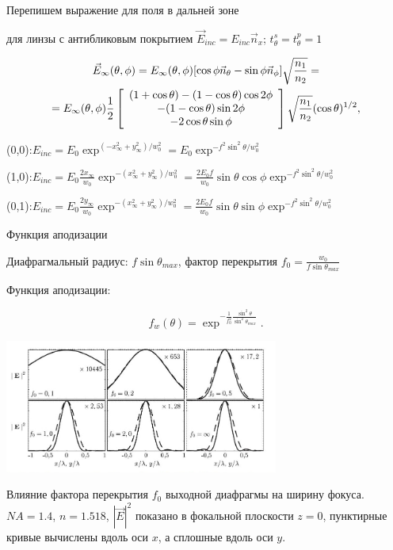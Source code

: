 \documentclass[9pt, compress, xcolor=table]{beamer}
\begin{document}
\begin{frame}{Перепишем выражение для поля в дальней зоне}

для линзы с антибликовым покрытием $\vec E_{inc} = E_{inc} \vec n_x$; $t_{\theta}^s =
t_{\theta}^p = 1$

\begin{multline*}
\vec E_{\infty}(\theta, \phi) =E_{\infty}(\theta,\phi)[\cos \phi \vec n_{\theta} - \sin \phi\vec
n_{\phi}] \sqrt{\frac{n_1}{n_2}} =
\\ =E_{\infty}(\theta, \phi) \frac{1}{2}\left[\array{c} (1 +
\cos \theta) - (1 - \cos \theta) \cos 2 \phi \\ - (1 - \cos \theta) \sin 2 \phi \\ - 2 \cos \theta
\sin \phi
\endarray\right] \sqrt{\frac{n_1}{n_2}} (\cos \theta)^{1/2},
\end{multline*}

(0,0):$ E_{inc} = E_0 \exp^{(-x_{\infty}^2 + y_{\infty}^2)/ w_0^2} = E_0 \exp^{-f^2 \sin^2 \theta
/ w_0^2}$

\medskip

(1,0):$ E_{inc} = E_0 \frac{2 x_{\infty}}{w_0}\exp^{-(x_{\infty}^2 + y_{\infty}^2)/w_0^2} = \frac{2
E_0 f}{w_0} \sin \theta \cos \phi \exp^{-f^2 \sin^2 \theta / w_0^2}$

\medskip

(0,1):$ E_{inc} = E_0 \frac{2 y_{\infty}}{w_0}\exp^{-(x_{\infty}^2 + y_{\infty}^2)/w_0^2} = \frac{2
E_0 f}{w_0} \sin \theta \sin \phi \exp^{-f^2 \sin^2 \theta / w_0^2}$


\end{frame}

\begin{frame}{Функция аподизации}

Диафрагмальный радиус: $f \sin \theta_{max}$, фактор перекрытия $f_0 = \frac{w_0}{f \sin
\theta_{max}}$

Функция аподизации:

\begin{equation*}
f_w(\theta) = \exp^{-\frac{1}{f_0^2}\frac{\sin^2 \theta}{\sin^2 \theta_{max}}}.
\end{equation*}

\begin{center}
\includegraphics[width=9cm]{fig3_07}
\end{center}

\small{Влияние фактора перекрытия $f_0$ выходной диафрагмы на ширину фокуса. $NA = 1.4$, $n=1.518$, $|\vec E|^2$ показано в фокальной плоскости $z = 0$, пунктирные кривые вычислены вдоль оси $x$, а сплошные вдоль оси $y$.}


\end{frame}
\end{document}
